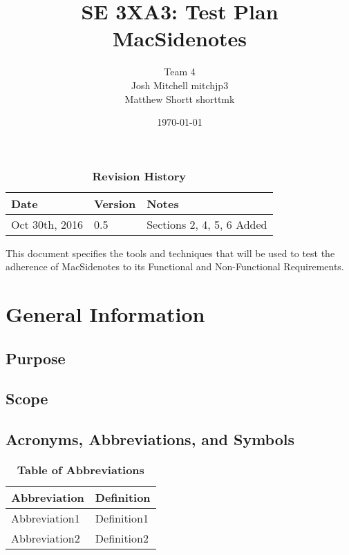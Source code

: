 \documentclass[12pt, titlepage]{article}
\title{SE 3XA3: Test Plan\\MacSidenotes}
\author{Team 4
		\\ Josh Mitchell mitchjp3
		\\ Matthew Shortt shorttmk
}
\date{\today}
\begin{document}
\maketitle

\tableofcontents
\listoftables
\listoffigures

\begin{table}[bp]
\caption{\bf Revision History}
\begin{tabularx}{\textwidth}{p{3cm}p{2cm}X}
\toprule {\bf Date} & {\bf Version} & {\bf Notes}\\
\midrule
Oct 30th, 2016 & 0.5 & Sections 2, 4, 5, 6 Added\\
\bottomrule
\end{tabularx}
\end{table}

\newpage


This document specifies the tools and techniques that will be used to test the 
adherence of MacSidenotes to its Functional and Non-Functional Requirements. 

\section{General Information}

\subsection{Purpose}

\subsection{Scope}

\subsection{Acronyms, Abbreviations, and Symbols}
	
\begin{table}[hbp]
\caption{\textbf{Table of Abbreviations}} \label{Table}

\begin{tabularx}{\textwidth}{p{3cm}X}
\toprule
\textbf{Abbreviation} & \textbf{Definition} \\
\midrule
Abbreviation1 & Definition1\\
Abbreviation2 & Definition2\\
\bottomrule
\end{tabularx}

\end{table}
\end{document}
